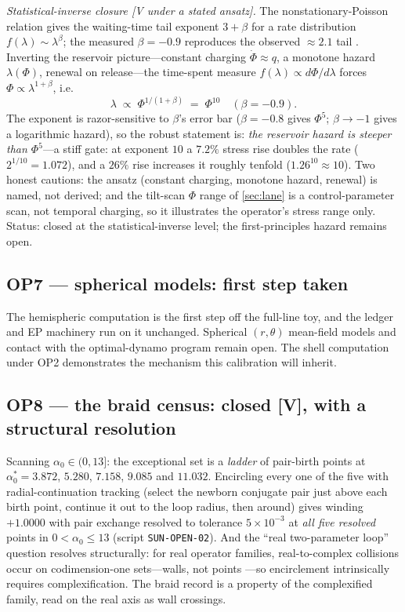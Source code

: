 \documentclass[11pt]{article}
\renewcommand{\S}{\mathhexbox278}
\theoremstyle{definition}
\theoremstyle{remark}
\begin{document}
\emph{Statistical-inverse closure [V under a stated ansatz].} The
nonstationary-Poisson relation gives the waiting-time tail exponent $3+\beta$
for a rate distribution $f(\lambda)\sim\lambda^{\beta}$; the measured
$\beta=-0.9$ reproduces the observed $\approx2.1$ tail \cite{wheatland}.
Inverting the reservoir picture---constant charging $\dot\Phi\approx q$, a
monotone hazard $\lambda(\Phi)$, renewal on release---the time-spent measure
$f(\lambda)\propto d\Phi/d\lambda$ forces $\Phi\propto\lambda^{1+\beta}$,
i.e.
\[
\lambda \;\propto\; \Phi^{1/(1+\beta)} \;=\; \Phi^{10}
\quad (\beta=-0.9).
\]
The exponent is razor-sensitive to $\beta$'s error bar ($\beta=-0.8$ gives
$\Phi^{5}$; $\beta\to-1$ gives a logarithmic hazard), so the robust
statement is: \emph{the reservoir hazard is steeper than $\Phi^{5}$}---a stiff gate: at exponent $10$ a $7.2\%$ stress rise doubles the rate
($2^{1/10}=1.072$), and a $26\%$ rise increases it roughly tenfold
($1.26^{10}\approx10$).
Two honest cautions: the ansatz (constant charging, monotone hazard,
renewal) is named, not derived; and the tilt-scan $\Phi$ range of
\S\ref{sec:lane} is a control-parameter scan, not temporal charging, so it
illustrates the operator's stress range only. Status: closed at the
statistical-inverse level; the first-principles hazard remains open.

\subsection*{OP7 --- spherical models: first step taken}
The hemispheric computation is the first step off the full-line toy, and the
ledger and EP machinery run on it unchanged. Spherical $(r,\theta)$
mean-field models and contact with the optimal-dynamo program
\cite{chenlivermore,herreman} remain open. The shell computation under OP2
demonstrates the mechanism this calibration will inherit.

\subsection*{OP8 --- the braid census: closed [V], with a structural resolution}
Scanning $\alpha_0\in(0,13]$: the exceptional set is a \emph{ladder} of
pair-birth points at $\alpha_0^* = 3.872$, $5.280$, $7.158$, $9.085$
and $11.032$.
Encircling every one of the five with radial-continuation tracking (select
the newborn conjugate pair just above each birth point, continue it out to
the loop radius, then around) gives winding $+1.0000$ with pair exchange resolved to tolerance
$5\times10^{-3}$ at \emph{all five resolved} points in $0<\alpha_0\le13$
(script \texttt{SUN-OPEN-02}). And the ``real two-parameter loop'' question resolves structurally:
for real operator families, real-to-complex collisions occur on
codimension-one sets---walls, not points \cite{kato}---so encirclement
intrinsically requires complexification. The braid record is a property of
the complexified family, read on the real axis as wall crossings.
\end{document}
